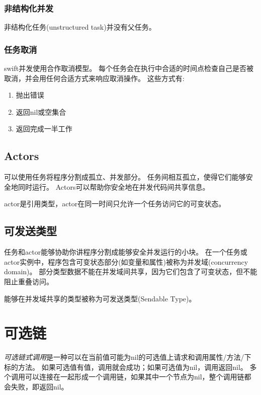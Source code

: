 \documentclass{../main.tex}{subfiles}
\begin{document}
\subsubsection{非结构化并发}
非结构化任务(unstructured task)并没有父任务。

\subsubsection{任务取消}
swift并发使用合作取消模型。
每个任务会在执行中合适的时间点检查自己是否被取消，并会用任何合适方式来响应取消操作。
这些方式有:
\begin{enumerate}[itemsep=0pt, parsep=0pt, topsep=0pt, partopsep=0pt]
    \item 抛出错误
    \item 返回nil或空集合
    \item 返回完成一半工作
\end{enumerate}

\subsection{Actors}
可以使用任务将程序分割成孤立、并发部分。
任务间相互孤立，使得它们能够安全地同时运行。
Actors可以帮助你安全地在并发代码间共享信息。

actor是引用类型，actor在同一时间只允许一个任务访问它的可变状态。

\subsection{可发送类型}
任务和actor能够协助你讲程序分割成能够安全并发运行的小块。
在一个任务或actor实例中，程序包含可变状态部分(如变量和属性)被称为并发域(concurrency domain)。
部分类型数据不能在并发域间共享，因为它们包含了可变状态，但不能阻止重叠访问。

能够在并发域共享的类型被称为可发送类型(Sendable Type)。


\section{可选链}
\emph{可选链式调用}是一种可以在当前值可能为nil的可选值上请求和调用属性/方法/下标的方法。
如果可选值有值，调用就会成功；如果可选值为nil，调用返回nil。
多个调用可以连接在一起形成一个调用链，如果其中一个节点为nil，整个调用链都会失败，即返回nil。



\end{document}
